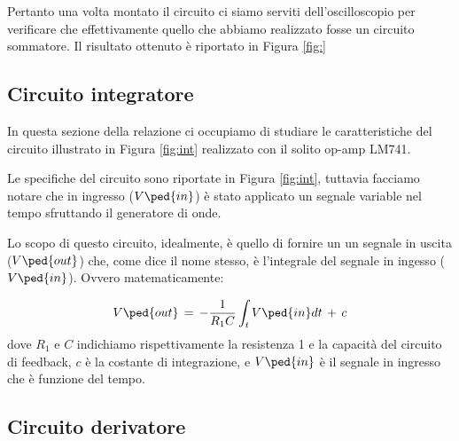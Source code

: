 Pertanto una volta montato il circuito ci siamo serviti dell'oscilloscopio per verificare che effettivamente quello che abbiamo realizzato fosse un circuito sommatore. Il risultato ottenuto è riportato in Figura \ref{fig:}

\subsection*{Circuito integratore}

In questa sezione della relazione ci occupiamo di studiare le caratteristiche del circuito illustrato in Figura \ref{fig:int} realizzato con il solito op-amp LM741.

Le specifiche del circuito sono riportate in Figura \ref{fig:int}, tuttavia facciamo notare che in ingresso ($V\ped{in}$) è stato applicato un segnale variable nel tempo sfruttando il generatore di onde.
 
Lo scopo di questo circuito, idealmente, è quello di fornire un un segnale in uscita ($V\ped{out}$) che, come dice il nome stesso, è l'integrale del segnale in ingesso ($V\ped{in}$). Ovvero matematicamente:

\begin{equation}
        V\ped{out}\,=\,-\frac{1}{R_1C} \int_{t}{V\ped{in}dt}\,+\,c
\end{equation}
%
dove $R_1$ e $C$ indichiamo rispettivamente la resistenza 1 e la capacità del circuito di feedback, $c$ è la costante di integrazione, e $V\ped{in}$ è il segnale in ingresso che è funzione del tempo. 



\subsection*{Circuito derivatore}
















